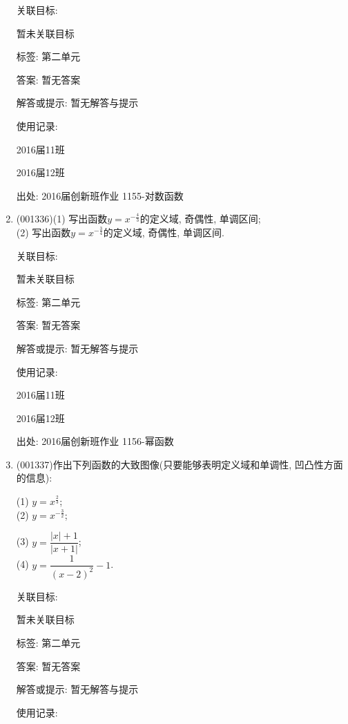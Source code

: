 \documentclass[10pt,a4paper]{article}
\begin{document}
\begin{enumerate}[1.]
关联目标:

暂未关联目标



标签: 第二单元

答案: 暂无答案

解答或提示: 暂无解答与提示

使用记录:

2016届11班	

2016届12班	


出处: 2016届创新班作业	1155-对数函数
\item { (001336)}(1) 写出函数$y=x^{-\frac{4}{3}}$的定义域, 奇偶性, 单调区间;\\ 
(2) 写出函数$y=x^{-\frac{3}{4}}$的定义域, 奇偶性, 单调区间.


关联目标:

暂未关联目标



标签: 第二单元

答案: 暂无答案

解答或提示: 暂无解答与提示

使用记录:

2016届11班		

2016届12班		


出处: 2016届创新班作业	1156-幂函数
\item { (001337)}作出下列函数的大致图像(只要能够表明定义域和单调性, 凹凸性方面的信息):\\ 
\begin{multicols}{2}
(1) $y=x^{\frac{2}{3}}$; \\ 
(2) $y=x^{-\frac{3}{2}}$; \\ 
\end{multicols}
\begin{multicols}{2}
(3) $y=\dfrac{|x|+1}{|x+1|}$;  \\ 
(4) $y=\dfrac{1}{(x-2)^2}-1$.
\end{multicols}


关联目标:

暂未关联目标



标签: 第二单元

答案: 暂无答案

解答或提示: 暂无解答与提示

使用记录:


\end{enumerate}
\end{document}
